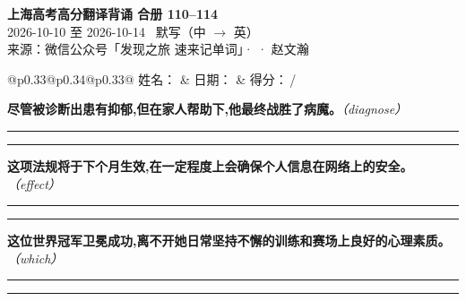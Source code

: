 \documentclass[11pt,a4paper]{article}
\newcommand{\num}[1]{\makebox[1.9em][r]{#1.}\hspace{0.3em}}
\newcommand{\wline}{\noindent\rule{\linewidth}{0.4pt}}
\newcommand{\prompt}[1]{\emph{\textcolor{tipblue}{\small（#1）}}}
\begin{document}
\pagestyle{plain}
\begin{center}
{\LARGE\bfseries 上海高考高分翻译背诵 \quad 合册 110–114}\\[0.25em]
{\large 2026-10-10 至 2026-10-14 \quad\ 默写（中 $\to$ 英）}\\[0.35em]
{\footnotesize 来源：微信公众号「发现之旅 速来记单词」·  · 赵文瀚}
\end{center}

\vspace{0.4em}
\noindent\begin{tabular}{@{}p{0.33\textwidth}@{}p{0.34\textwidth}@{}p{0.33\textwidth}@{}}
姓名：\underline{\hspace{2.0cm}} & 日期：\underline{\hspace{2.0cm}} & 得分：\underline{\hspace{1.4cm}}\,/ \\
\end{tabular}

\vspace{0.5em}

\vspace{0.8em}
\vspace{0.35em}\vspace{0.15em}

\begin{minipage}{\linewidth}

\num{1}\textbf{尽管被诊断出患有抑郁,但在家人帮助下,他最终战胜了病魔。}\prompt{diagnose}

\vspace{0.3em}

\wline\vspace{0.3em}
\wline

\end{minipage}

\begin{minipage}{\linewidth}

\num{2}\textbf{这项法规将于下个月生效,在一定程度上会确保个人信息在网络上的安全。}\prompt{effect}

\vspace{0.3em}

\wline\vspace{0.3em}
\wline

\end{minipage}

\begin{minipage}{\linewidth}

\num{3}\textbf{这位世界冠军卫冕成功,离不开她日常坚持不懈的训练和赛场上良好的心理素质。}\prompt{which}

\vspace{0.3em}

\wline\vspace{0.3em}
\wline

\end{minipage}
\end{document}

